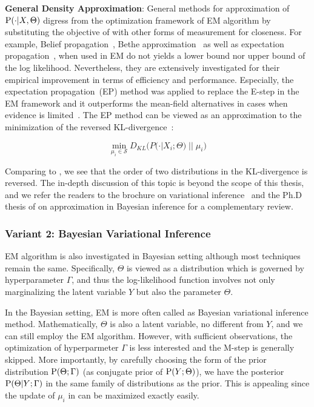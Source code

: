 \noindent \textbf{General Density Approximation}: General methods for
approximation of $\P(\cdot | X, \Theta)$ digress from the optimization framework
of EM algorithm by substituting the objective of  with
other forms of measurement for closeness. For example, Belief
propagation~\cite{yedidia2005constructing}, Bethe
approximation~\cite{burgess1978bethe} as well as expectation
propagation~\cite{minka2001expectation}, when used in EM do not yields a lower
bound nor upper bound of the log likelihood. Nevertheless, they are extensively
investigated for their empirical improvement in terms of efficiency and
performance. Especially, the expectation propagation~(EP) method was applied to
replace the E-step in the EM framework and it outperforms the mean-field
alternatives in cases when evidence is limited~\cite{wang2012truncation}. The EP
method can be viewed as an approximation to the minimization of the reversed
KL-divergence~\cite{minka2005divergence}:

\begin{equation}
\min\limits_{\mu_i \in \mathcal{S}} D_{KL}
\big(P(\cdot | X_i; \Theta) \; ||\;  \mu_i\big)\label{eq::em-alg-e-appro-rev}
\end{equation}

Comparing  to , we see
that the order of two distributions in the KL-divergence is reversed. The
in-depth discussion of this topic is beyond the scope of this thesis, and we
refer the readers to the brochure on variational
inference~\cite{wainwright2008graphical} and the Ph.D thesis of
\citet{minka2001family} on approximation in Bayesian inference for a
complementary review.

\subsubsection{Variant 2: Bayesian Variational Inference}

EM algorithm is also investigated in Bayesian setting although most techniques
remain the same. Specifically, $\Theta$ is viewed as a distribution which is
governed by hyperparameter $\Gamma$, and thus the log-likelihood function
involves not only marginalizing the latent variable $Y$ but also the parameter
$\Theta$.

In the Bayesian setting, EM is more often called as Bayesian variational
inference method. Mathematically, $\Theta$ is also a latent variable, no
different from $Y$, and we can still employ the EM algorithm. However, with
sufficient observations, the optimization of hyperparmeter $\Gamma$ is less
interested and the M-step is generally skipped. More importantly, by carefully
choosing the form of the prior distribution $\P(\Theta ; \Gamma)$ (as conjugate
prior of $\P(Y ; \Theta)$), we have the posterior $\P(\Theta | Y ; \Gamma)$ in
the same family of distributions as the prior. This is appealing since the
update of $\mu_i$ in  can be maximized exactly easily.

